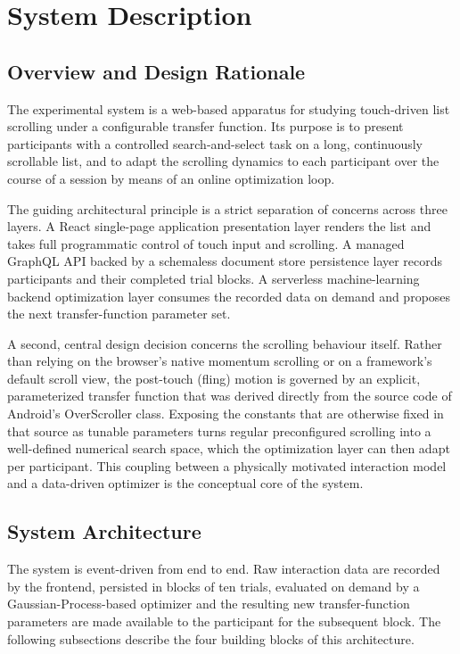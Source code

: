\documentclass[12pt,a4paper]{report}
\begin{document}
        \chapter{System Description}

        \section{Overview and Design Rationale}

        The experimental system is a web-based apparatus for studying touch-driven list scrolling under a configurable transfer function. Its purpose is to present participants with a controlled search-and-select task on a long, continuously scrollable list, and to adapt the scrolling dynamics to each participant over the course of a session by means of an online optimization loop.

        The guiding architectural principle is a strict separation of concerns across three layers. A React single-page application presentation layer renders the list and takes full programmatic control of touch input and scrolling. A managed GraphQL API backed by a schemaless document store persistence layer records participants and their completed trial blocks. A serverless machine-learning backend optimization layer consumes the recorded data on demand and proposes the next transfer-function parameter set.

        A second, central design decision concerns the scrolling behaviour itself. Rather than relying on the browser's native momentum scrolling or on a framework's default scroll view, the post-touch (fling) motion is governed by an explicit, parameterized transfer function that was derived directly from the source code of Android's OverScroller class. Exposing the constants that are otherwise fixed in that source as tunable parameters turns regular preconfigured scrolling into a well-defined numerical search space, which the optimization layer can then adapt per participant. This coupling between a physically motivated interaction model and a data-driven optimizer is the conceptual core of the system.

        \section{System Architecture}

        The system is event-driven from end to end. Raw interaction data are recorded by the frontend, persisted in blocks of ten trials, evaluated on demand by a Gaussian-Process-based optimizer and the resulting new transfer-function parameters are made available to the participant for the subsequent block. The following subsections describe the four building blocks of this architecture.
\end{document}
